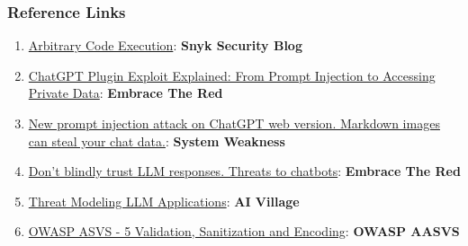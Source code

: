 \documentclass[
]{article}
\providecommand{\tightlist}{%
  \setlength{\itemsep}{0pt}\setlength{\parskip}{0pt}}
\begin{document}
\subsubsection{Reference Links}\label{reference-links}

\begin{enumerate}
\def\labelenumi{\arabic{enumi}.}
\tightlist
\item
  \href{https://security.snyk.io/vuln/SNYK-PYTHON-LANGCHAIN-5411357}{Arbitrary
  Code Execution}: \textbf{Snyk Security Blog}
\item
  \href{https://embracethered.com/blog/posts/2023/chatgpt-cross-plugin-request-forgery-and-prompt-injection./}{ChatGPT
  Plugin Exploit Explained: From Prompt Injection to Accessing Private
  Data}: \textbf{Embrace The Red}
\item
  \href{https://systemweakness.com/new-prompt-injection-attack-on-chatgpt-web-version-ef717492c5c2?gi=8daec85e2116}{New
  prompt injection attack on ChatGPT web version. Markdown images can
  steal your chat data.}: \textbf{System Weakness}
\item
  \href{https://embracethered.com/blog/posts/2023/ai-injections-threats-context-matters/}{Don't
  blindly trust LLM responses. Threats to chatbots}: \textbf{Embrace The
  Red}
\item
  \href{https://aivillage.org/large\%20language\%20models/threat-modeling-llm/}{Threat
  Modeling LLM Applications}: \textbf{AI Village}
\item
  \href{https://owasp-aasvs4.readthedocs.io/en/latest/V5.html\#validation-sanitization-and-encoding}{OWASP
  ASVS - 5 Validation, Sanitization and Encoding}: \textbf{OWASP AASVS}
\end{enumerate}
\end{document}
